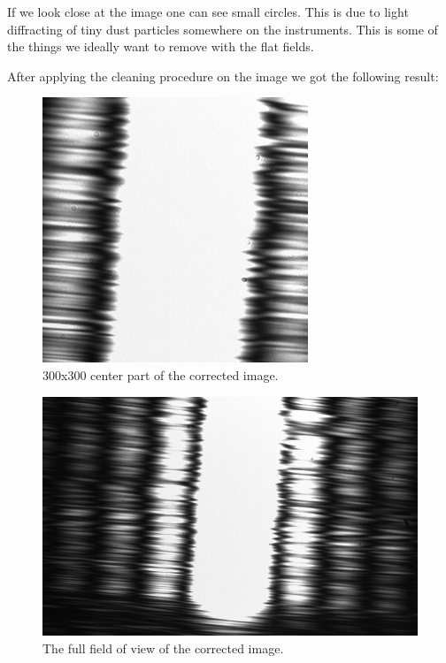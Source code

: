 \documentclass{emulateapj}
\begin{document}
If we look close at the image one can see small circles. This is due to light diffracting of tiny dust particles somewhere on the instruments. This is some of the things we ideally want to remove with the flat fields.

After applying the cleaning procedure on the image we got the following result:

\begin{figure}[H]
\centering
\includegraphics[scale=0.3]{corrected_image.png}
\caption{300x300 center part of the corrected image.}
\label{img:corr}
\end{figure}

\begin{figure}[H]
\centering
\includegraphics[scale=0.2]{corrected_image_fov.png}
\caption{The full field of view of the corrected image.}
\label{img:corrFOV}
\end{figure}
\end{document}
